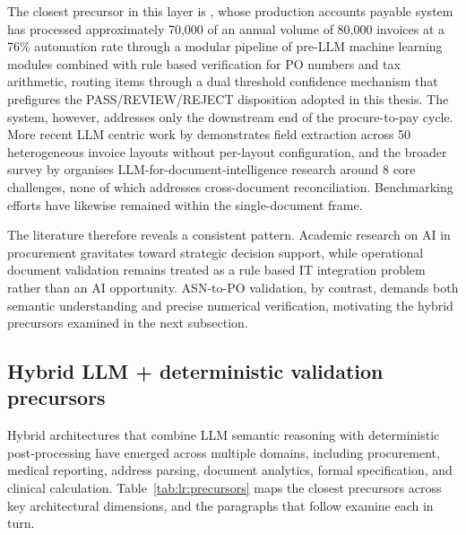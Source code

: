 The closest precursor in this layer is \citet{kanaparthi2023}, whose production accounts payable system has processed approximately 70,000 of an annual volume of 80,000 invoices at a 76\% automation rate through a modular pipeline of pre-LLM machine learning modules combined with rule based verification for PO numbers and tax arithmetic, routing items through a dual threshold confidence mechanism that prefigures the PASS/REVIEW/REJECT disposition adopted in this thesis. The system, however, addresses only the downstream end of the procure-to-pay cycle. More recent LLM centric work by \citet{loukil2024} demonstrates field extraction across 50 heterogeneous invoice layouts without per-layout configuration, and the broader survey by \citet{ke2025} organises LLM-for-document-intelligence research around 8 core challenges, none of which addresses cross-document reconciliation. Benchmarking efforts \citep{berghaus2025,hasan2025} have likewise remained within the single-document frame.

The literature therefore reveals a consistent pattern. Academic research on AI in procurement gravitates toward strategic decision support, while operational document validation remains treated as a rule based IT integration problem rather than an AI opportunity. ASN-to-PO validation, by contrast, demands both semantic understanding and precise numerical verification, motivating the hybrid precursors examined in the next subsection.


\subsection{Hybrid LLM + deterministic validation precursors}
\label{sec:lr:sota:hybrid}

Hybrid architectures that combine LLM semantic reasoning with deterministic post-processing have emerged across multiple domains, including procurement, medical reporting, address parsing, document analytics, formal specification, and clinical calculation. Table~\ref{tab:lr:precursors} maps the closest precursors across key architectural dimensions, and the paragraphs that follow examine each in turn.

